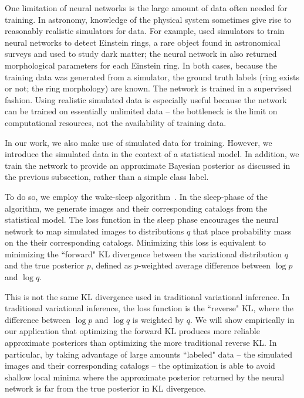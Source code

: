 One limitation of neural networks is the large amount of data often needed for training.
In astronomy, knowledge of the physical system sometimes give rise to reasonably realistic simulators for data. 
For example, \cite{Lanusse_2017_cmudeeplens} used simulators to train neural networks to detect Einstein rings, 
a rare object found in astronomical surveys and used to study dark matter; the neural network in \cite{Hezaveh_2017_nn_lensing_nature} also returned
morphological parameters for each Einstein ring. 
In both cases, because the training data was generated from a simulator, the ground truth labels (ring exists or not; the ring morphology) are known. 
The network is trained in a supervised fashion. 
Using realistic simulated data is especially useful because the network can be trained on essentially unlimited data -- the bottleneck is the limit on computational resources, not the availability of training data. 

In our work, we also make use of simulated data for training. However, we introduce the simulated data in the context of a statistical model.
In addition, we train the network to provide an approximate Bayesian posterior as discussed in the previous subsection, rather than a simple class label. 

To do so, we employ the wake-sleep algorithm~\cite{Hinton1995wake_sleep}. 
In the sleep-phase of the algorithm, we generate images and their corresponding catalogs from the statistical model. 
The loss function in the sleep phase encourages the neural network to map simulated images to distributions $q$ that place probability mass on the their corresponding catalogs.
Minimizing this loss is equivalent to minimizing the ``forward" KL divergence between the variational distribution $q$ and the true posterior $p$, defined as $p$-weighted average difference between $\log p$ and $\log q$. 

This is not the same KL divergence used in traditional variational inference.
In traditional variational inference, the loss function is the ``reverse" KL, where the difference between $\log p$ and $\log q$ is weighted by $q$.
We will show empirically in our application that optimizing the forward KL produces more reliable approximate posteriors than optimizing the more traditional reverse KL. 
In particular, by taking advantage of large amounts ``labeled" data -- the simulated images and their corresponding catalogs -- the optimization is able to avoid shallow local minima where the approximate posterior returned by the neural network is far from the true posterior in KL divergence. 

